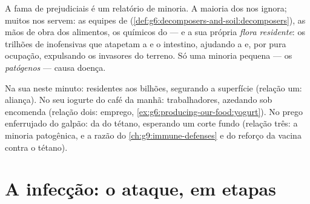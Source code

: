 \begin{proposition}\label{prop:g9:microbes-and-infection:mostly}
A fama de prejudiciais é um relatório de minoria. A maioria
dos  nos ignora; muitos nos servem: as equipes de
(\cref{def:g6:decomposers-and-soil:decomposers}), as mãos de
obra dos alimentos, os químicos do  --- e a sua própria
\emph{flora residente}: os trilhões de
 inofensivas que atapetam a  e o intestino,
ajudando a  e, por pura ocupação, expulsando os
invasores do terreno. Só uma minoria pequena --- os
\emph{patógenos} --- causa doença.
\end{proposition}
\admitted

\begin{example}\label{ex:g9:microbes-and-infection:relations}
Na sua  neste minuto: residentes aos bilhões, segurando a
superfície (relação um: aliança). No seu iogurte do café da
manhã: trabalhadores, azedando sob encomenda (relação dois:
emprego, \cref{ex:g6:producing-our-food:yogurt}). No prego
enferrujado do galpão:  da  do tétano,
esperando um corte fundo (relação três: a minoria patogênica,
e a razão do \cref{ch:g9:immune-defenses} e do reforço da
vacina contra o tétano).
\end{example}

\section{A infecção: o ataque, em etapas}

